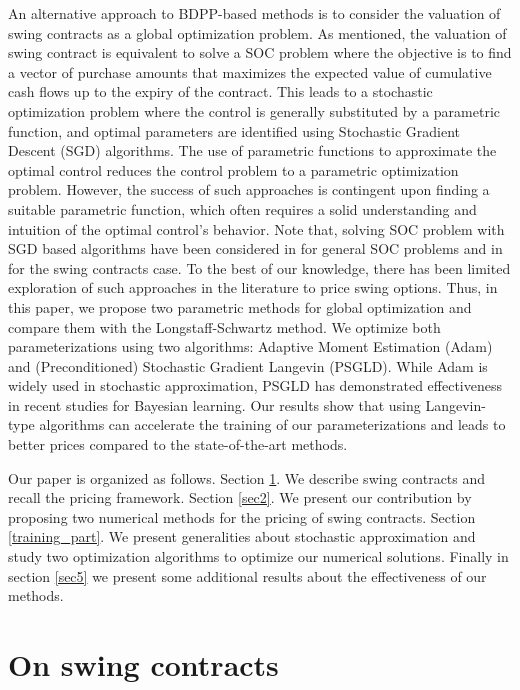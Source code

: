 \documentclass{article}
\numberwithin{equation}{section}
\begin{document}
An alternative approach to BDPP-based methods is to consider the valuation of swing contracts as a global optimization problem. As mentioned, the valuation of swing contract is equivalent to solve a SOC problem where the objective is to find a vector of purchase amounts that maximizes the expected value of cumulative cash flows up to the expiry of the contract. This leads to a stochastic optimization problem where the control is generally substituted by a parametric function, and optimal parameters are identified using Stochastic Gradient Descent (SGD) algorithms. The use of parametric functions to approximate the optimal control reduces the control problem to a parametric optimization problem. However, the success of such approaches is contingent upon finding a suitable parametric function, which often requires a solid understanding and intuition of the optimal control's behavior. Note that, solving SOC problem with SGD based algorithms have been considered in \cite{GobetMunos} for general SOC problems and in \cite{BarreraEsteve2006NumericalMF} for the swing contracts case. To the best of our knowledge, there has been limited exploration of such approaches in the literature to price swing options. Thus, in this paper, we propose two parametric methods for global optimization and compare them with the Longstaff-Schwartz method. We optimize both parameterizations using two algorithms: Adaptive Moment Estimation (Adam) and (Preconditioned) Stochastic Gradient Langevin (PSGLD). While Adam is widely used in stochastic approximation, PSGLD has demonstrated effectiveness in recent studies for Bayesian learning. Our results show that using Langevin-type algorithms can accelerate the training of our parameterizations and leads to better prices compared to the state-of-the-art methods.


Our paper is organized as follows. Section \ref{sec1}. We describe swing contracts and recall the pricing framework. Section \ref{sec2}. We present our contribution by proposing two numerical methods for the pricing of swing contracts. Section \ref{training_part}. We present generalities about stochastic approximation and study two optimization algorithms to optimize our numerical solutions. Finally in section \ref{sec5} we present some additional results about the effectiveness of our methods.



\section{On swing contracts}
\label{sec1}
\end{document}
